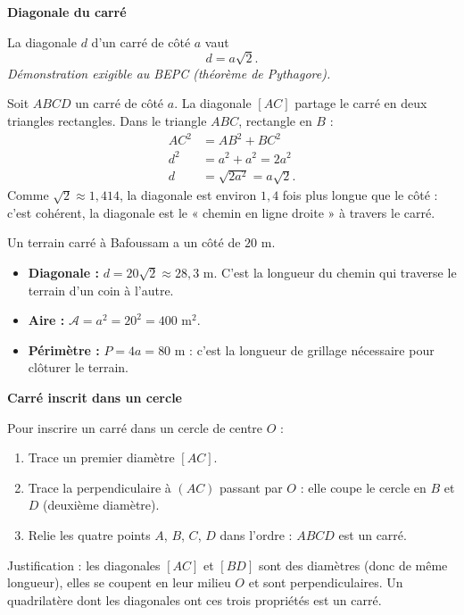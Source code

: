 \documentclass[11pt]{article}
\begin{document}
\textbf{Diagonale du carré}

\begin{propriete}
La diagonale $d$ d'un carré de côté $a$ vaut
\[ d = a\sqrt{2}. \]
\emph{Démonstration exigible au BEPC (théorème de Pythagore).}
\end{propriete}

\begin{experience}
Soit $ABCD$ un carré de côté $a$. La diagonale $[AC]$ partage le carré en deux triangles rectangles. Dans le triangle $ABC$, rectangle en $B$ :
\begin{align*}
AC^2 &= AB^2 + BC^2\\
d^2 &= a^2 + a^2 = 2a^2\\
d &= \sqrt{2a^2} = a\sqrt{2}.
\end{align*}
Comme $\sqrt{2} \approx 1,414$, la diagonale est environ $1,4$ fois plus longue que le côté : c'est cohérent, la diagonale est le « chemin en ligne droite » à travers le carré.
\end{experience}

\begin{exemplebox}
Un terrain carré à Bafoussam a un côté de $20$ m.
\begin{itemize}
\item \textbf{Diagonale :} $d = 20\sqrt{2} \approx 28,3$ m. C'est la longueur du chemin qui traverse le terrain d'un coin à l'autre.
\item \textbf{Aire :} $\mathcal{A} = a^2 = 20^2 = 400$ m$^2$.
\item \textbf{Périmètre :} $P = 4a = 80$ m : c'est la longueur de grillage nécessaire pour clôturer le terrain.
\end{itemize}
\end{exemplebox}

\textbf{Carré inscrit dans un cercle}

\begin{methode}
Pour inscrire un carré dans un cercle de centre $O$ :
\begin{enumerate}
\item Trace un premier diamètre $[AC]$.
\item Trace la perpendiculaire à $(AC)$ passant par $O$ : elle coupe le cercle en $B$ et $D$ (deuxième diamètre).
\item Relie les quatre points $A$, $B$, $C$, $D$ dans l'ordre : $ABCD$ est un carré.
\end{enumerate}
Justification : les diagonales $[AC]$ et $[BD]$ sont des diamètres (donc de même longueur), elles se coupent en leur milieu $O$ et sont perpendiculaires. Un quadrilatère dont les diagonales ont ces trois propriétés est un carré.
\end{methode}
\end{document}
